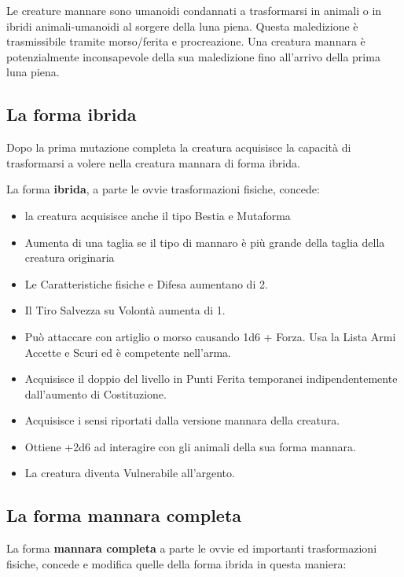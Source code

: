 \begin{multicols}{2}

Le creature mannare sono umanoidi condannati a trasformarsi in animali o in ibridi animali-umanoidi al sorgere della luna piena. Questa maledizione è trasmissibile tramite morso/ferita e procreazione. Una creatura mannara è potenzialmente inconsapevole della sua maledizione fino all'arrivo della prima luna piena.

\subsection{La forma ibrida}

Dopo la prima mutazione completa la creatura acquisisce la capacità di trasformarsi a volere nella creatura mannara di forma ibrida.

La forma \textbf{ibrida}, a parte le ovvie trasformazioni fisiche, concede:

\begin{itemize}[leftmargin=*] \setlength{\itemsep}{0pt}
	\item la creatura acquisisce anche il tipo Bestia e Mutaforma
	\item Aumenta di una taglia se il tipo di mannaro è più grande della taglia della creatura originaria
	\item Le Caratteristiche fisiche e Difesa aumentano di 2.
	\item Il Tiro Salvezza su Volontà aumenta di 1.
	\item Può attaccare con artiglio o morso causando 1d6 + Forza. Usa la Lista Armi Accette e Scuri ed è competente nell'arma.
	\item Acquisisce il doppio del livello in Punti Ferita temporanei indipendentemente dall'aumento di Costituzione.
	\item Acquisisce i sensi riportati dalla versione mannara della creatura.
	\item Ottiene +2d6 ad interagire con gli animali della sua forma mannara.
	\item La creatura diventa Vulnerabile all'argento.
\end{itemize}

\subsection{La forma mannara completa}

La forma \textbf{mannara completa} a parte le ovvie ed importanti trasformazioni fisiche, concede e modifica quelle della forma ibrida in questa maniera:


\end{multicols}
